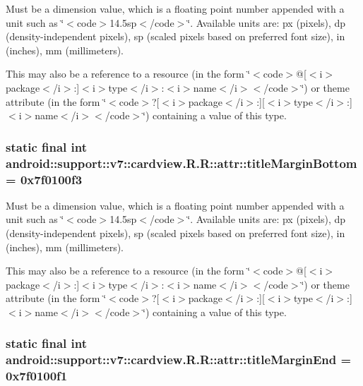 Must be a dimension value, which is a floating point number appended with a unit such as \char`\"{}$<$code$>$14.5sp$<$/code$>$\char`\"{}. Available units are: px (pixels), dp (density-independent pixels), sp (scaled pixels based on preferred font size), in (inches), mm (millimeters). 

This may also be a reference to a resource (in the form \char`\"{}$<$code$>$@\mbox{[}$<$i$>$package$<$/i$>$:\mbox{]}$<$i$>$type$<$/i$>$:$<$i$>$name$<$/i$>$$<$/code$>$\char`\"{}) or theme attribute (in the form \char`\"{}$<$code$>$?\mbox{[}$<$i$>$package$<$/i$>$:\mbox{]}\mbox{[}$<$i$>$type$<$/i$>$:\mbox{]}$<$i$>$name$<$/i$>$$<$/code$>$\char`\"{}) containing a value of this type. \hypertarget{classandroid_1_1support_1_1v7_1_1cardview_1_1_r_1_1attr_5f36f313299704afe7d24b42a9a51e8e}{
\subsubsection[{titleMarginBottom}]{\setlength{\rightskip}{0pt plus 5cm}static final int android::support::v7::cardview.R.R::attr::titleMarginBottom = 0x7f0100f3}}
\label{classandroid_1_1support_1_1v7_1_1cardview_1_1_r_1_1attr_5f36f313299704afe7d24b42a9a51e8e}


Must be a dimension value, which is a floating point number appended with a unit such as \char`\"{}$<$code$>$14.5sp$<$/code$>$\char`\"{}. Available units are: px (pixels), dp (density-independent pixels), sp (scaled pixels based on preferred font size), in (inches), mm (millimeters). 

This may also be a reference to a resource (in the form \char`\"{}$<$code$>$@\mbox{[}$<$i$>$package$<$/i$>$:\mbox{]}$<$i$>$type$<$/i$>$:$<$i$>$name$<$/i$>$$<$/code$>$\char`\"{}) or theme attribute (in the form \char`\"{}$<$code$>$?\mbox{[}$<$i$>$package$<$/i$>$:\mbox{]}\mbox{[}$<$i$>$type$<$/i$>$:\mbox{]}$<$i$>$name$<$/i$>$$<$/code$>$\char`\"{}) containing a value of this type. \hypertarget{classandroid_1_1support_1_1v7_1_1cardview_1_1_r_1_1attr_5ca0e9c484123cda7710799dff420628}{
\subsubsection[{titleMarginEnd}]{\setlength{\rightskip}{0pt plus 5cm}static final int android::support::v7::cardview.R.R::attr::titleMarginEnd = 0x7f0100f1}}
\label{classandroid_1_1support_1_1v7_1_1cardview_1_1_r_1_1attr_5ca0e9c484123cda7710799dff420628}



